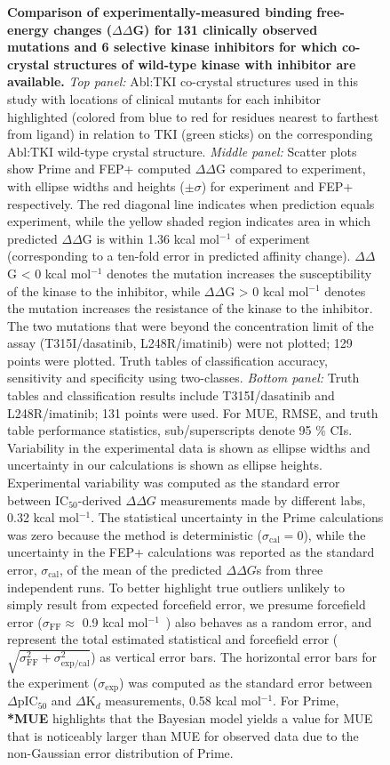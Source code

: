 \documentclass[phd,tocprelim]{cornell}
\begin{document}
\begin{landscape}
	\begin{figure}
		\caption[Figure caption]{{\bf Comparison of experimentally-measured binding free-energy changes ($\Delta \Delta$G) for 131 clinically observed mutations and 6 selective kinase inhibitors for which co-crystal structures of wild-type kinase with inhibitor are available.}
			\emph{Top panel:} Abl:TKI co-crystal structures used in this study with locations of clinical mutants for each inhibitor highlighted (colored from blue to red for residues nearest to farthest from ligand) in relation to TKI (green sticks) on the corresponding Abl:TKI wild-type crystal structure.
			\emph{Middle panel:} Scatter plots show Prime and FEP+ computed $\Delta \Delta $G compared to experiment, with ellipse widths and heights ($\pm\sigma$) for experiment and FEP+ respectively.
			The red diagonal line indicates when prediction equals experiment, while the yellow shaded region indicates area in which predicted $\Delta \Delta$G is within 1.36 kcal mol$^{-1}$ of experiment (corresponding to a ten-fold error in predicted affinity change).
			$\Delta \Delta$G < 0 kcal mol$^{-1}$ denotes the mutation increases the susceptibility of the kinase to the inhibitor, while $\Delta \Delta$G > 0 kcal mol$^{-1}$ denotes the mutation increases the resistance of the kinase to the inhibitor.
			The two mutations that were beyond the concentration limit of the assay (T315I/dasatinib, L248R/imatinib) were not plotted; 129 points were plotted.
			Truth tables of classification accuracy, sensitivity and specificity using two-classes. 
			\emph{Bottom panel:} Truth tables and classification results include T315I/dasatinib and L248R/imatinib; 131 points were used.
			For MUE, RMSE, and truth table performance statistics, sub/superscripts denote 95 \% CIs. 
			Variability in the experimental data is shown as ellipse widths and uncertainty in our calculations is shown as ellipse heights. 
			Experimental variability was computed as the standard error between IC$_{50}$-derived $\Delta \Delta G$ measurements made by different labs, 0.32 kcal mol$^{-1}$. 
			The statistical uncertainty in the Prime calculations was zero because the method is deterministic ($\sigma_\mathrm{cal}=0$), while the uncertainty in the FEP+ calculations was reported as the standard error, $\sigma_\mathrm{cal}$, of the mean of the predicted $\Delta \Delta G$s from three independent runs. 
			To better highlight true outliers unlikely to simply result from expected forcefield error, we presume forcefield error ($\sigma_\mathrm{FF} \approx$ 0.9 kcal mol$^{-1}$~\cite{Harder:J.Chem.TheoryComput.:2016}) also behaves as a random error, and represent the total estimated statistical and forcefield error ($\sqrt{\sigma_\mathrm{FF}^2 + \sigma_\mathrm{exp/cal}^2}$) as vertical error bars. 
			The horizontal error bars for the experiment ($\sigma_\mathrm{exp}$) was computed as the standard error between $\Delta$pIC$_{50}$ and $\Delta$K$_{d}$ measurements, 0.58 kcal mol$^{-1}$.
			For Prime, \textbf{*MUE} highlights that the Bayesian model yields a value for MUE that is noticeably larger than MUE for observed data due to the non-Gaussian error distribution of Prime.}
	\end{figure}
\end{landscape}
\end{document}
